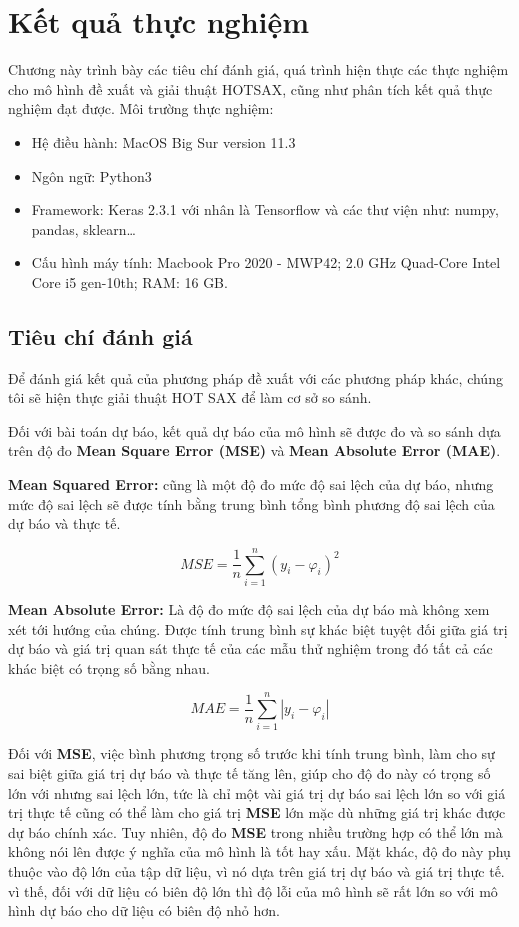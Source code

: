 \chapter{Kết quả thực nghiệm}
Chương này trình bày các tiêu chí đánh giá, quá trình hiện thực các thực nghiệm cho mô hình đề xuất và giải thuật HOTSAX, cũng như phân tích kết quả thực nghiệm đạt được.
Môi trường thực nghiệm:
\begin{itemize}
\item Hệ điều hành: MacOS Big Sur version 11.3
\item Ngôn ngữ: Python3
\item Framework: Keras 2.3.1 với nhân là Tensorflow và các thư viện như: numpy, pandas, sklearn…
\item Cấu hình máy tính: Macbook Pro 2020 - MWP42; 2.0 GHz Quad-Core Intel Core i5 gen-10th; RAM: 16 GB.
\end{itemize}

\section{Tiêu chí đánh giá}



Để đánh giá kết quả của phương pháp đề xuất với các phương pháp khác, chúng tôi sẽ hiện thực giải thuật HOT SAX để làm cơ sở so sánh. 

Đối với bài toán dự báo, kết quả dự báo của mô hình sẽ được đo và so sánh dựa trên độ đo \textbf{Mean Square Error (MSE)} và \textbf{Mean Absolute Error (MAE)}.

\textbf{Mean Squared Error:} cũng là một độ đo mức độ sai lệch của dự báo, nhưng mức độ sai lệch sẽ được tính bằng trung bình tổng bình phương độ sai lệch của dự báo và thực tế.

\begin{equation}
\label{eq:24}
MSE =\frac{1}{n}\sum_{i=1}^{n}(y_i-\varphi_i)^2
\tag{24}
\end{equation}

\textbf{Mean Absolute Error:} Là độ đo mức độ sai lệch của dự báo mà không xem xét tới hướng của chúng. Được tính trung bình sự khác biệt tuyệt đối giữa giá trị dự báo và giá trị quan sát thực tế của các mẫu thử nghiệm trong đó tất cả các khác biệt có trọng số bằng nhau.

\begin{equation}
\label{eq:25}
MAE =\frac{1}{n}\sum_{i=1}^{n}|y_i-\varphi_i|
\tag{25}
\end{equation}

Đối với \textbf{MSE}, việc bình phương trọng số trước khi tính trung bình, làm cho sự sai biệt giữa giá trị dự báo và thực tế tăng lên, giúp cho độ đo này có trọng số lớn với nhưng sai lệch lớn, tức là chỉ một vài giá trị dự báo sai lệch lớn so với giá trị thực tế cũng có thể làm cho giá trị \textbf{MSE} lớn mặc dù những giá trị khác được dự báo chính xác. Tuy nhiên, độ đo \textbf{MSE} trong nhiều trường hợp có thể lớn mà không nói lên được ý nghĩa của mô hình là tốt hay xấu. Mặt khác, độ đo này phụ thuộc vào độ lớn của tập dữ liệu, vì nó dựa trên giá trị dự báo và giá trị thực tế. vì thế, đối với dữ liệu có biên độ lớn thì độ lỗi của mô hình sẽ rất lớn so với mô hình dự báo cho dữ liệu có biên độ nhỏ hơn.

